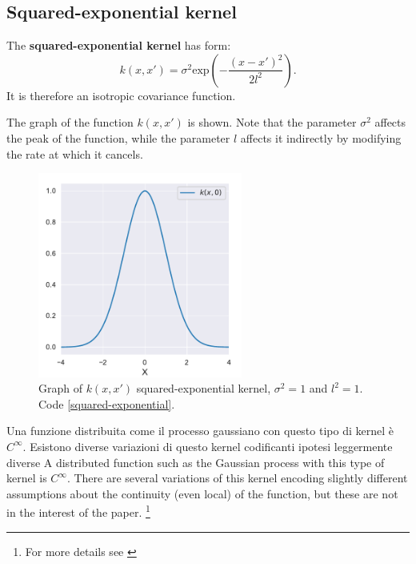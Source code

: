 \subsection{Squared-exponential kernel}


\begin{defi}
  The \textbf{squared-exponential kernel} has form:
\[
k(x,x')=\sigma^2 \text{exp}\left( -\frac{(x-x')^2}{2l^2} \right).
\]
It is therefore an isotropic covariance function.
\end{defi}

The graph of the function $k(x,x')$ is shown. Note that the parameter $\sigma^2$ affects the peak of the function, while the parameter $l$ affects it indirectly by modifying the rate at which it cancels.



\begin{figure}[h]
    \centering
    \includegraphics[width=0.6\textwidth]{images/Gaussian process/Squared-exponential kernel.pdf}
    \caption{Graph of $k(x,x')$ squared-exponential kernel, $\sigma^2=1$ and $l^2=1$. Code \ref{squared-exponential}.}
    \label{squared-exponential kernel}
\end{figure}

\newpage

Una funzione distribuita come il processo gaussiano con questo tipo di kernel è $C^\infty$. Esistono diverse variazioni di questo kernel codificanti ipotesi leggermente diverse
A distributed function such as the Gaussian process with this type of kernel is $C^\infty$. There are several variations of this kernel encoding slightly different assumptions about the continuity (even local) of the function, but these are not in the interest of the paper. \footnote{For more details see \cite{duvenaud_automatic_2014}}
\vspace{0.5cm}\\

